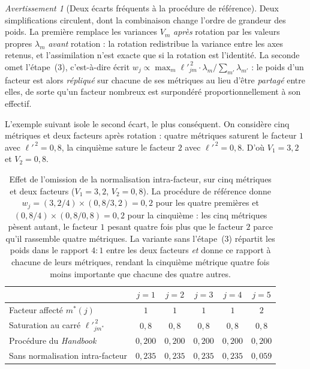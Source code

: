 \documentclass[11pt,a4paper]{article}
\theoremstyle{definition}
\theoremstyle{remark}
\newtheorem{avertissement}{Avertissement}[section]
\begin{document}
\medskip

\begin{avertissement}[Deux écarts fréquents à la procédure de référence]
  \label{av:oecd}
  Deux simplifications circulent, dont la combinaison change l'ordre de grandeur des
  poids. La première remplace les variances $V_m$ \emph{après} rotation par les valeurs
  propres $\lambda_m$ \emph{avant} rotation : la rotation redistribue la variance entre
  les axes retenus, et l'assimilation n'est exacte que si la rotation est l'identité. La
  seconde omet l'étape~(3), c'est-à-dire écrit
  $w_j \propto \max_m \ell'^{\,2}_{jm} \cdot \lambda_m / \sum_{m'}\lambda_{m'}$ : le
  poids d'un facteur est alors \emph{répliqué} sur chacune de ses métriques au lieu
  d'être \emph{partagé} entre elles, de sorte qu'un facteur nombreux est surpondéré
  proportionnellement à son effectif.
\end{avertissement}

\bigskip

L'exemple suivant isole le second écart, le plus conséquent. On considère cinq métriques
et deux facteurs après rotation : quatre métriques saturent le facteur $1$ avec
$\ell'^{\,2} = 0{,}8$, la cinquième sature le facteur $2$ avec $\ell'^{\,2} = 0{,}8$.
D'où $V_1 = 3{,}2$ et $V_2 = 0{,}8$.

\medskip

\begin{table}[htbp]
  \centering
  \small
  \renewcommand{\arraystretch}{1.25}
  \begin{tabular}{@{}l c c c c c@{}}
    \toprule
    & $j = 1$ & $j = 2$ & $j = 3$ & $j = 4$ & $j = 5$ \\
    \midrule
    Facteur affecté $m^*(j)$ & $1$ & $1$ & $1$ & $1$ & $2$ \\
    Saturation au carré $\ell'^{\,2}_{j m^*}$ &
      $0{,}8$ & $0{,}8$ & $0{,}8$ & $0{,}8$ & $0{,}8$ \\
    \midrule
    Procédure du \emph{Handbook} &
      $0{,}200$ & $0{,}200$ & $0{,}200$ & $0{,}200$ & $0{,}200$ \\
    Sans normalisation intra-facteur &
      $0{,}235$ & $0{,}235$ & $0{,}235$ & $0{,}235$ & $0{,}059$ \\
    \bottomrule
  \end{tabular}
  \caption{Effet de l'omission de la normalisation intra-facteur, sur cinq métriques et
  deux facteurs ($V_1 = 3{,}2$, $V_2 = 0{,}8$). La procédure de référence donne
  $w_j = (3{,}2/4)\times(0{,}8/3{,}2) = 0{,}2$ pour les quatre premières et
  $(0{,}8/4)\times(0{,}8/0{,}8) = 0{,}2$ pour la cinquième : les cinq métriques pèsent
  autant, le facteur $1$ pesant quatre fois plus que le facteur $2$ parce qu'il rassemble
  quatre métriques. La variante sans l'étape~(3) répartit les poids dans le rapport
  $4 : 1$ entre les deux facteurs \emph{et} donne ce rapport à chacune de leurs
  métriques, rendant la cinquième métrique quatre fois moins importante que chacune des
  quatre autres.}
  \label{tab:oecd-exemple}
\end{table}
\end{document}
